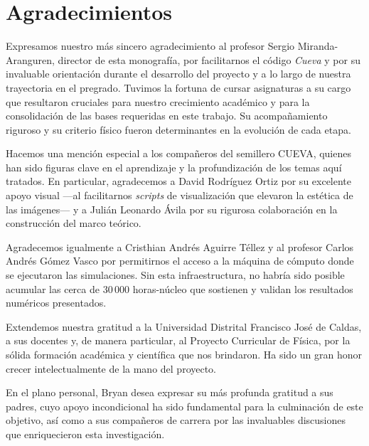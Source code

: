 
\chapter*{Agradecimientos}

\primerparrafo Expresamos nuestro más sincero agradecimiento al profesor Sergio Miranda-Aranguren, director de esta monografía, por facilitarnos el código \textit{Cueva} y por su invaluable orientación durante el desarrollo del proyecto y a lo largo de nuestra trayectoria en el pregrado. Tuvimos la fortuna de cursar asignaturas a su cargo que resultaron cruciales para nuestro crecimiento académico y para la consolidación de las bases requeridas en este trabajo. Su acompañamiento riguroso y su criterio físico fueron determinantes en la evolución de cada etapa.

Hacemos una mención especial a los compañeros del semillero CUEVA, quienes han sido figuras clave en el aprendizaje y la profundización de los temas aquí tratados. En particular, agradecemos a David Rodríguez Ortiz por su excelente apoyo visual ---al facilitarnos \textit{scripts} de visualización que elevaron la estética de las imágenes--- y a Julián Leonardo Ávila por su rigurosa colaboración en la construcción del marco teórico.

Agradecemos igualmente a Cristhian Andrés Aguirre Téllez y al profesor Carlos Andrés Gómez Vasco por permitirnos el acceso a la máquina de cómputo donde se ejecutaron las simulaciones. Sin esta infraestructura, no habría sido posible acumular las cerca de $30\,000$ horas-núcleo que sostienen y validan los resultados numéricos presentados.

Extendemos nuestra gratitud a la Universidad Distrital Francisco José de Caldas, a sus docentes y, de manera particular, al Proyecto Curricular de Física, por la sólida formación académica y científica que nos brindaron. Ha sido un gran honor crecer intelectualmente de la mano del proyecto.

En el plano personal, Bryan desea expresar su más profunda gratitud a sus padres, cuyo apoyo incondicional ha sido fundamental para la culminación de este objetivo, así como a sus compañeros de carrera por las invaluables discusiones que enriquecieron esta investigación.

